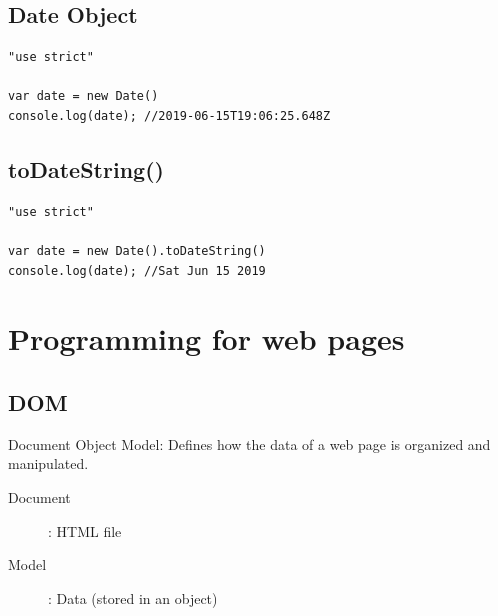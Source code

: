 \documentclass[10pt, a4paper, twocolumn]{article}
\begin{document}
\subsection{Date Object}

\begin{lstlisting}
"use strict"

var date = new Date()
console.log(date); //2019-06-15T19:06:25.648Z

\end{lstlisting}

\subsection{toDateString()}

\begin{lstlisting}
"use strict"

var date = new Date().toDateString()
console.log(date); //Sat Jun 15 2019
\end{lstlisting}

\section{Programming for web pages}

\subsection{DOM}

Document Object Model: Defines how the data of a web page is organized and manipulated.

\begin{description}
	\item[Document] : HTML file
	\item[Model]:  Data (stored in an object)
\end{description}



\printbibliography[title={Bibliography}] %

\end{document}
